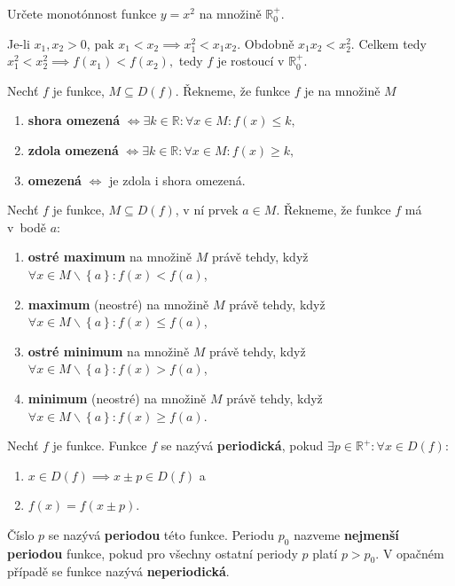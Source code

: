 \begin{priklad}
Určete monotónnost funkce $y=x^2$ na množině $\mathbb R_0^+.$
\end{priklad}
\begin{reseni}
Je-li $x_1,x_2 >0$, pak $x_1 < x_2 \implies x_1^2 < x_1x_2.$ Obdobně $x_1x_2<x_2^2$.
Celkem tedy $x_1^2<x_2^2 \implies f(x_1)<f(x_2),$ tedy $f$ je rostoucí v $\mathbb R_0^+.$
\end{reseni}

\begin{definition}
  Nechť $f$ je funkce, $M\subseteq D(f)$. Řekneme, že funkce $f$ je na množině $M$
  \begin{enumerate}[$i.$]
    \item \textbf{shora omezená} $\iff \exists k \in \mathbb R: \forall x \in M: f(x)\leq k,$
    \item \textbf{zdola omezená} $\iff \exists k \in \mathbb R: \forall x \in M: f(x)\geq k,$
    \item \textbf{omezená} $\iff $ je zdola i shora omezená.
  \end{enumerate}
\end{definition}

\begin{definition}
  Nechť $f$ je funkce, $M \subseteq D(f)$, v ní prvek $a \in M$.
  Řekneme, že funkce $f$ má v~bodě $a$:
  \begin{enumerate}[$i.$]
    \item \textbf{ostré maximum} na množině $M$ právě tehdy, když $\forall x \in M\smallsetminus \left \{ a \right \}  : f(x) < f(a)$,
    \item \textbf{maximum} (neostré) na množině $M$ právě tehdy, když $\forall x \in M \smallsetminus \left \{ a \right \}: f(x) \leq f(a)$,
    \item \textbf{ostré minimum} na množině $M$ právě tehdy, když $\forall x \in M\smallsetminus \left \{ a \right \}: f(x) > f(a)$,
    \item \textbf{minimum} (neostré) na množině $M$ právě tehdy, když $\forall x \in M\smallsetminus \left \{ a \right \} : f(x) \geq f(a)$.
  \end{enumerate}
\end{definition}

\begin{definition}
  Nechť $f$ je funkce. Funkce $f$ se nazývá \textbf{periodická}, pokud $\exists p \in \mathbb R^{+}: \forall x \in D(f):$
  \begin{enumerate}
    \item $x \in D(f) \implies x \pm p \in D(f)$ a
    \item $f(x) = f(x \pm p)$.
  \end{enumerate}
  Číslo $p$ se nazývá \textbf{periodou} této funkce. Periodu $p_0$ nazveme \textbf{nejmenší periodou} funkce, pokud pro všechny ostatní periody $p$ platí $p > p_0$. V opačném případě se funkce nazývá \textbf{neperiodická}.
\end{definition}

